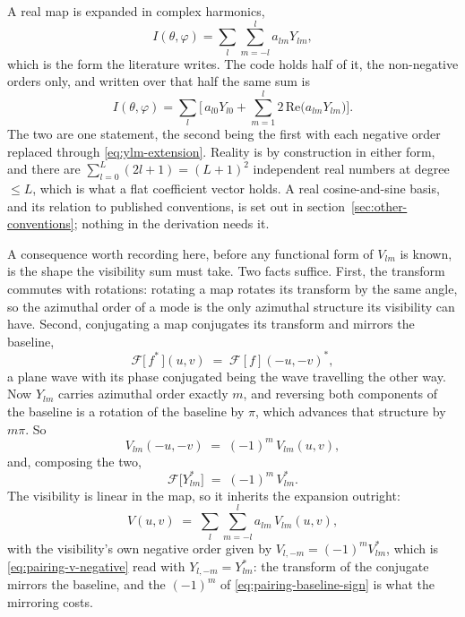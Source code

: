 A real map is expanded in complex harmonics,
\begin{equation}
  I(\theta,\varphi) = \sum_{l} \sum_{m=-l}^{l} a_{lm} Y_{lm} ,
  \label{eq:map-full}
\end{equation}
which is the form the literature writes.  The code holds half of it, the non-negative orders
only, and written over that half the same sum is
\begin{equation}
  I(\theta,\varphi) = \sum_{l} \Big[ \, a_{l0} Y_{l0}
  + \sum_{m=1}^{l} 2\,\mathrm{Re}\big( a_{lm} Y_{lm} \big) \Big] .
  \label{eq:map-from-half-complex}
\end{equation}
The two are one statement, the second being the first with each negative order replaced through
\eqref{eq:ylm-extension}.  Reality is by construction in either form, and there are
$\sum_{l=0}^{L} (2l+1) = (L+1)^2$ independent real numbers at degree $\le L$, which is what a
flat coefficient vector holds.  A real cosine-and-sine basis, and its relation to published
conventions, is set out in section~\ref{sec:other-conventions}; nothing in the derivation
needs it.

A consequence worth recording here, before any functional form of $V_{lm}$ is known, is the
shape the visibility sum must take.  Two facts suffice.  First, the transform commutes with
rotations: rotating a map rotates its transform by the same angle, so the azimuthal order of a
mode is the only azimuthal structure its visibility can have.  Second, conjugating a map
conjugates its transform and mirrors the baseline,
\begin{equation}
  \mathcal{F}\bigl[\,f^*\,\bigr](u,v) \;=\; \mathcal{F}[f](-u,-v)^* ,
  \label{eq:transform-conjugate}
\end{equation}
a plane wave with its phase conjugated being the wave travelling the other way.  Now $Y_{lm}$
carries azimuthal order exactly $m$, and reversing both components of the baseline is a rotation
of the baseline by $\pi$, which advances that structure by $m\pi$.  So
\begin{equation}
  V_{lm}(-u,-v) \;=\; (-1)^m\,V_{lm}(u,v) ,
  \label{eq:pairing-baseline-sign}
\end{equation}
and, composing the two,
\begin{equation}
  \mathcal{F}\bigl[Y_{lm}^*\bigr] \;=\; (-1)^m\,V_{lm}^* .
  \label{eq:pairing-v-negative}
\end{equation}
The visibility is linear in the map, so it inherits the expansion outright:
\begin{equation}
  V(u,v) \;=\; \sum_{l}\sum_{m=-l}^{l} a_{lm}\,V_{lm}(u,v) ,
  \label{eq:pairing-visibility-full}
\end{equation}
with the visibility's own negative order given by $V_{l,-m} = (-1)^mV_{lm}^*$,
which is \eqref{eq:pairing-v-negative} read with $Y_{l,-m} = Y_{lm}^*$: the transform
of the conjugate mirrors the baseline, and the $(-1)^m$ of \eqref{eq:pairing-baseline-sign} is
what the mirroring costs.

